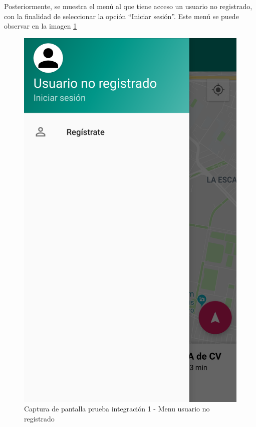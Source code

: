 Posteriormente, se muestra el menú al que tiene acceso un usuario no registrado, con la finalidad de seleccionar la opción ``Iniciar sesión''. Este menú se puede observar en la imagen \ref{fig:int2}

\begin{figure}[H]
	\centering
	\includegraphics[scale=.2]{DocumentoTecnico/Capitulo6/integracion/Software/images/2.png}
	\caption{Captura de pantalla prueba integración 1 - Menu usuario no registrado}
	\label{fig:int2}
\end{figure}


